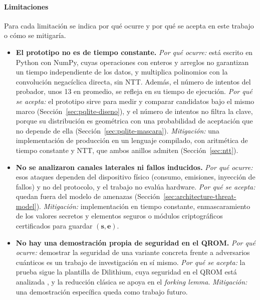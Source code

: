 \paragraph{Limitaciones}
\label{sec:pqlite-limitaciones}
Para cada limitación se indica por qué ocurre y por qué se acepta en este trabajo o cómo se mitigaría.
\begin{itemize}
    \item \textbf{El prototipo no es de tiempo constante.}
    \textit{Por qué ocurre:} está escrito en Python con NumPy, cuyas operaciones con enteros y arreglos no garantizan un tiempo independiente de los datos, y multiplica polinomios con la convolución negacíclica directa, sin NTT. Además, el número de intentos del probador, unos 13 en promedio, se refleja en su tiempo de ejecución.
    \textit{Por qué se acepta:} el prototipo sirve para medir y comparar candidatos bajo el mismo marco (Sección~\ref{sec:pqlite-diseno}), y el número de intentos no filtra la clave, porque su distribución es geométrica con una probabilidad de aceptación que no depende de ella (Sección~\ref{sec:pqlite-mascara}).
    \textit{Mitigación:} una implementación de producción en un lenguaje compilado, con aritmética de tiempo constante y NTT, que ambos anillos admiten (Sección~\ref{sec:ntt}).

    \item \textbf{No se analizaron canales laterales ni fallos inducidos.}
    \textit{Por qué ocurre:} esos ataques dependen del dispositivo físico (consumo, emisiones, inyección de fallos) y no del protocolo, y el trabajo no evalúa hardware.
    \textit{Por qué se acepta:} quedan fuera del modelo de amenazas (Sección~\ref{sec:architecture-threat-model}).
    \textit{Mitigación:} implementación en tiempo constante, enmascaramiento de los valores secretos y elementos seguros o módulos criptográficos certificados para guardar $(\mathbf{s}, \mathbf{e})$.

    \item \textbf{No hay una demostración propia de seguridad en el QROM.}
    \textit{Por qué ocurre:} demostrar la seguridad de una variante concreta frente a adversarios cuánticos es un trabajo de investigación en sí mismo.
    \textit{Por qué se acepta:} la prueba sigue la plantilla de Dilithium, cuya seguridad en el QROM está analizada \cite{liu2019revisiting, kiltz2018concrete, devevey2023detailed, barbosa2023fixing}, y la reducción clásica se apoya en el \textit{forking lemma}.
    \textit{Mitigación:} una demostración específica queda como trabajo futuro.


\end{itemize}

